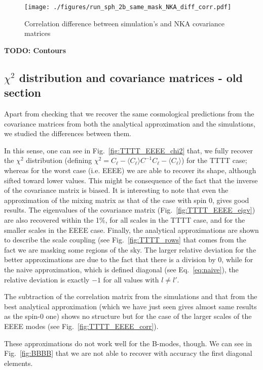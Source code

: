 \documentclass[a4paper,11pt]{article}
\newcommand{\todo}[1]{{\bf TODO: #1}}
\newcommand{\cl}{C_\ell}
\begin{document}
\begin{figure}[htb]
  \centering
  \texttt{[image: ./figures/run\_sph\_2b\_same\_mask\_NKA\_diff\_corr.pdf]}
  \caption{Correlation difference between simulation's and NKA covariance
    matrices}
  \label{fig:corr_diff_2bins}
\end{figure}

\todo{Contours}

\subsection{$\chi^2$ distribution and covariance matrices - old section}
Apart from checking that we recover the same cosmological predictions from the
covariance matrices from both the analytical approximation and the
simulations, we studied the differences between them.

In this sense, one can see in Fig.~\ref{fig:TTTT_EEEE_chi2} that, we fully
recover the $\chi^2$ distribution (defining $\chi^2 = \cl - \langle \cl
\rangle C^{-1} \cl - \langle \cl \rangle$) for the TTTT case; whereas for the
worst case (i.e. EEEE) we are able to recover its shape, although sifted
toward lower values. This might be consequence of the fact that the inverse of
the covariance matrix is biased. It is interesting to note that even
the approximation of the mixing matrix as that of the case with spin 0, gives
good results. The eigenvalues of the covariance matrix
(Fig.~\ref{fig:TTTT_EEEE_eigv}) are also recovered within the 1\%, for all
scales in the TTTT case, and for the smaller scales in the EEEE case. Finally,
the analytical approximations are shown to describe the scale coupling (see
Fig.~\ref{fig:TTTT_rows} that comes from the fact we are masking some regions
of the sky. The larger relative deviation for the better approximations are
due to the fact that there is a division by $0$, while for the naive
approximation, which is defined diagonal (see Eq.~\ref{eq:naive}), the
relative deviation is exactly $-1$ for all values with $l \neq l'$.

The subtraction of the correlation matrix from the simulations and that from
the best analytical approximation (which we have just seen gives almost same
results as the spin-0 one) shows no structure but for the case of the larger
scales of the EEEE modes (see Fig.~\ref{fig:TTTT_EEEE_corr}).

These approximations do not work well for the B-modes, though. We can see in
Fig.~\ref{fig:BBBB} that we are not able to recover with accuracy the first
diagonal elements.
\end{document}
